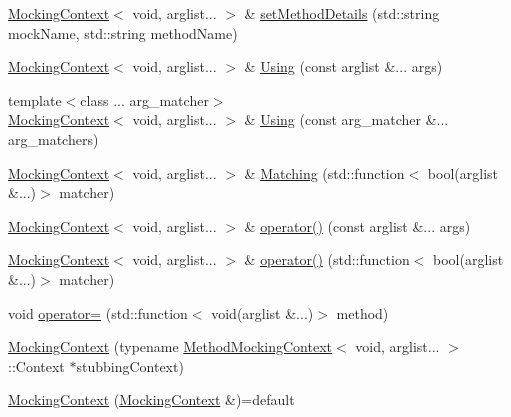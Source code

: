 \begin{DoxyCompactItemize}
\item 
\mbox{\hyperlink{classfakeit_1_1MockingContext}{Mocking\+Context}}$<$ void, arglist... $>$ \& \mbox{\hyperlink{classfakeit_1_1MockingContext_3_01void_00_01arglist_8_8_8_01_4_a5479ea5b1a1f32898cc9592bfb1c7777}{set\+Method\+Details}} (std\+::string mock\+Name, std\+::string method\+Name)
\item 
\mbox{\hyperlink{classfakeit_1_1MockingContext}{Mocking\+Context}}$<$ void, arglist... $>$ \& \mbox{\hyperlink{classfakeit_1_1MockingContext_3_01void_00_01arglist_8_8_8_01_4_a0dad4e59214a5fdcacad0e4a170df071}{Using}} (const arglist \&... args)
\item 
{\footnotesize template$<$class ... arg\+\_\+matcher$>$ }\\\mbox{\hyperlink{classfakeit_1_1MockingContext}{Mocking\+Context}}$<$ void, arglist... $>$ \& \mbox{\hyperlink{classfakeit_1_1MockingContext_3_01void_00_01arglist_8_8_8_01_4_aaab0ad3883ab87bd3885671e3266546e}{Using}} (const arg\+\_\+matcher \&... arg\+\_\+matchers)
\item 
\mbox{\hyperlink{classfakeit_1_1MockingContext}{Mocking\+Context}}$<$ void, arglist... $>$ \& \mbox{\hyperlink{classfakeit_1_1MockingContext_3_01void_00_01arglist_8_8_8_01_4_a28152fc4e0105f5e6424515367a5d4c3}{Matching}} (std\+::function$<$ bool(arglist \&...)$>$ matcher)
\item 
\mbox{\hyperlink{classfakeit_1_1MockingContext}{Mocking\+Context}}$<$ void, arglist... $>$ \& \mbox{\hyperlink{classfakeit_1_1MockingContext_3_01void_00_01arglist_8_8_8_01_4_a73476d376f7ec5631ba9a37ff5264599}{operator()}} (const arglist \&... args)
\item 
\mbox{\hyperlink{classfakeit_1_1MockingContext}{Mocking\+Context}}$<$ void, arglist... $>$ \& \mbox{\hyperlink{classfakeit_1_1MockingContext_3_01void_00_01arglist_8_8_8_01_4_a1a5a55569a763877d395635979e6b3d6}{operator()}} (std\+::function$<$ bool(arglist \&...)$>$ matcher)
\item 
void \mbox{\hyperlink{classfakeit_1_1MockingContext_3_01void_00_01arglist_8_8_8_01_4_a86584df9e9a7a73b078ad68fa5893d50}{operator=}} (std\+::function$<$ void(arglist \&...)$>$ method)
\item 
\mbox{\hyperlink{classfakeit_1_1MockingContext_3_01void_00_01arglist_8_8_8_01_4_a655f7e31674dfb282f30a94f31ffd2a7}{Mocking\+Context}} (typename \mbox{\hyperlink{classfakeit_1_1MethodMockingContext}{Method\+Mocking\+Context}}$<$ void, arglist... $>$\+::Context $\ast$stubbing\+Context)
\item 
\mbox{\hyperlink{classfakeit_1_1MockingContext_3_01void_00_01arglist_8_8_8_01_4_a750dcc8fb80a9931c41143ce73d7177c}{Mocking\+Context}} (\mbox{\hyperlink{classfakeit_1_1MockingContext}{Mocking\+Context}} \&)=default

\end{DoxyCompactItemize}
